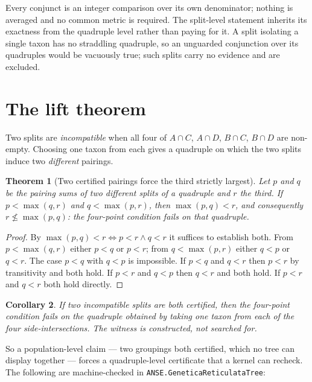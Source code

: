 \documentclass[11pt,a4paper]{article}
\newtheorem{theorem}{Theorem}[section]
\newtheorem{corollary}[theorem]{Corollary}
\theoremstyle{definition}
\theoremstyle{remark}
\begin{document}
Every conjunct is an integer comparison over its own denominator; nothing is
averaged and no common metric is required. The split-level statement inherits its
exactness from the quadruple level rather than paying for it. A split isolating a
single taxon has no straddling quadruple, so an unguarded conjunction over its
quadruples would be vacuously true; such splits carry no evidence and are
excluded.

\section{The lift theorem}\label{sec:lift}

Two splits are \emph{incompatible} when all four of $A \cap C$, $A \cap D$, $B
\cap C$, $B \cap D$ are non-empty. Choosing one taxon from each gives a quadruple
on which the two splits induce two \emph{different} pairings.

\begin{theorem}[Two certified pairings force the third strictly largest]
\label{thm:lift}
Let $p$ and $q$ be the pairing sums of two different splits of a quadruple and
$r$ the third. If $p < \max(q,r)$ and $q < \max(p,r)$, then $\max(p,q) < r$, and
consequently $r \not\le \max(p,q)$: the four-point condition fails on that
quadruple.
\end{theorem}

\begin{proof}
By $\max(p,q) < r \iff p<r \wedge q<r$ it suffices to establish both. From
$p < \max(q,r)$ either $p<q$ or $p<r$; from $q < \max(p,r)$ either $q<p$ or
$q<r$. The case $p<q$ with $q<p$ is impossible. If $p<q$ and $q<r$ then $p<r$ by
transitivity and both hold. If $p<r$ and $q<p$ then $q<r$ and both hold. If $p<r$
and $q<r$ both hold directly.
\end{proof}

\begin{corollary}
If two incompatible splits are both certified, then the four-point condition
fails on the quadruple obtained by taking one taxon from each of the four
side-intersections. The witness is \emph{constructed}, not searched for.
\end{corollary}

So a population-level claim --- two groupings both certified, which no tree can
display together --- forces a quadruple-level certificate that a kernel can
recheck. The following are machine-checked in
\texttt{ANSE.GeneticaReticulataTree}:
\end{document}
